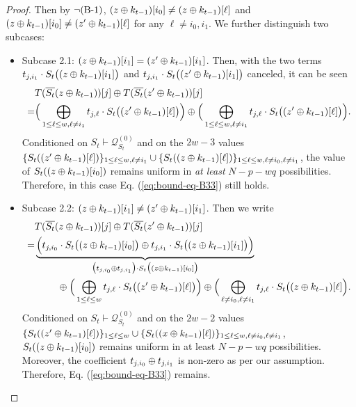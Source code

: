 \documentclass[journal=tosc,final,nohyperref]{iacrtrans}
\begin{document}
\begin{proof}
	Then by $\neg\text{(B-1)}$, $(z\oplus k_{t-1})[i_0]\neq(z\oplus k_{t-1})[\ell]$ and $(z\oplus k_{t-1})[i_0]\neq(z'\oplus k_{t-1})[\ell]$ for any $\ell\neq i_0,i_1$. We further distinguish two subcases:
	\begin{itemize}
		\item Subcase 2.1: $(z\oplus k_{t-1})[i_1]=(z'\oplus k_{t-1})[i_1]$. Then, with the two terms $t_{j,i_1}\cdot S_t\big((z\oplus k_{t-1})[i_1]\big)$ and $t_{j,i_1}\cdot S_t\big((z'\oplus k_{t-1})[i_1]\big)$ canceled, it can be seen
		\begin{align*}
		&  T(\overline{S_t}(z\oplus k_{t-1}))[j]\oplus T(\overline{S_t}(z'\oplus k_{t-1}))[j]       \\
		= &
		\Big(\bigoplus_{1\leq\ell\leq w,\ell\neq i_1}t_{j,\ell}\cdot S_t\big((z'\oplus k_{t-1})[\ell]\big)\Big)\oplus
		\Big(\bigoplus_{1\leq\ell\leq w,\ell\neq i_1}t_{j,\ell}\cdot S_t\big((z'\oplus k_{t-1})[\ell]\big)\Big)   .
		\end{align*}
		Conditioned on $S_t\vdash\mathcal{Q}_{S_t}^{(0)}$ and on the $2w-3$ values $\{S_t((z'\oplus k_{t-1})[\ell])\}_{1\leq \ell\leq w,\ell\neq i_1}\cup\{S_t((z\oplus k_{t-1})[\ell])\}_{1\leq \ell\leq w,\ell\neq i_0,\ell\neq i_1}$, the value of $S_t((z\oplus k_{t-1})[i_0])$ remains uniform in {\it at least} $N-p-wq$ possibilities. Therefore, in this case Eq. (\ref{eq:bound-eq-B33}) still holds.
		\item Subcase 2.2: $(z\oplus k_{t-1})[i_1]\neq(z'\oplus k_{t-1})[i_1]$. Then we write
		\begin{align*}
		&  T(\overline{S_t}(z\oplus k_{t-1}))[j]\oplus T(\overline{S_t}(z'\oplus k_{t-1}))[j]       \\
		= &   \underbrace{\Big(t_{j,i_0}\cdot S_t\big((z\oplus k_{t-1})[i_0]\big)
			\oplus
			t_{j,i_1}\cdot S_t\big((z\oplus k_{t-1})[i_1]\big)\Big)}_{\big(t_{j,i_0}\oplus t_{j,i_1}\big)\cdot S_t\big((z\oplus k_{t-1})[i_0]\big)}   	\\
		&\ \ \ \ \ \ \ \oplus
		\Big(\bigoplus_{1\leq\ell\leq w}t_{j,\ell}\cdot S_t\big((z'\oplus k_{t-1})[\ell]\big)\Big)    \oplus
		\Big(\bigoplus_{\ell\neq i_0,\ell\neq i_1}t_{j,\ell}\cdot S_t\big((z\oplus k_{t-1})[\ell]\Big).
		\end{align*}
		Conditioned on $S_t\vdash\mathcal{Q}_{S_t}^{(0)}$ and on the $2w-2$ values $\{S_t((z'\oplus k_{t-1})[\ell])\}_{1\leq \ell\leq w}\cup\{S_t((x\oplus k_{t-1})[\ell])\}_{1\leq \ell\leq w,\ell\neq i_0,\ell\neq i_1}$, $S_t((z\oplus k_{t-1})[i_0])$ remains uniform in at least $N-p-wq$ possibilities. Moreover, the coefficient $t_{j,i_0}\oplus t_{j,i_1}$ is non-zero as per our assumption. Therefore, Eq. (\ref{eq:bound-eq-B33}) remains.
	\end{itemize}
	

\end{proof}
\end{document}
